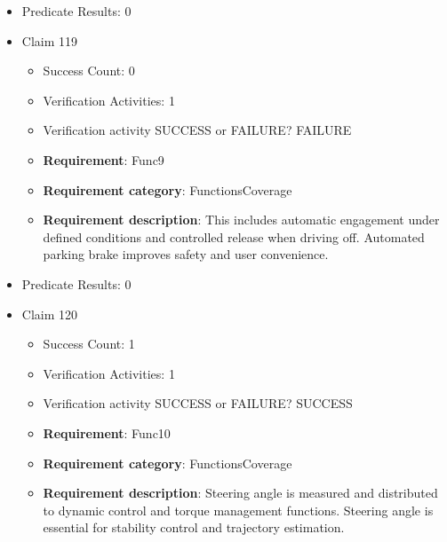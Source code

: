 \documentclass{article}
\begin{document}
\begin{itemize}
\begin{itemize}
						\item \textbf{Requirement}: Func8 
						\item \textbf{Requirement category}: FunctionsCoverage 
						\item \textbf{Requirement description}: Mileage is accumulated from validated speed and distance measurements. Odometer information is required for maintenance, diagnostics, and regulatory compliance.
					
				\end{itemize}
				
									    
				\item Predicate Results: 0

  				  \item Claim 119
				\begin{itemize}
			    	\item Success Count: 0 
			    	\item Verification Activities: 1
					\item Verification activity SUCCESS or FAILURE? FAILURE
		
						\item \textbf{Requirement}: Func9 
						\item \textbf{Requirement category}: FunctionsCoverage 
						\item \textbf{Requirement description}: This includes automatic engagement under defined conditions and controlled release when driving off. Automated parking brake improves safety and user convenience.
					
				\end{itemize}
				
									    
				\item Predicate Results: 0

  				  \item Claim 120
				\begin{itemize}
			    	\item Success Count: 1 
			    	\item Verification Activities: 1
					\item Verification activity SUCCESS or FAILURE? SUCCESS
		
						\item \textbf{Requirement}: Func10 
						\item \textbf{Requirement category}: FunctionsCoverage 
						\item \textbf{Requirement description}: Steering angle is measured and distributed to dynamic control and torque management functions. Steering angle is essential for stability control and trajectory estimation.
					

\end{itemize}
\end{itemize}
\end{document}
